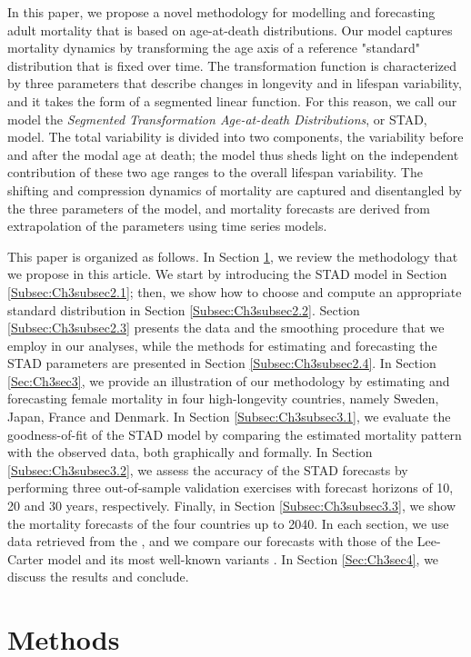 \documentclass[Thesis]{subfiles}
\begin{document}
In this paper, we propose a novel methodology for modelling and forecasting adult mortality that is based on age-at-death distributions. Our model captures mortality dynamics by transforming the age axis of a reference "standard" distribution that is fixed over time. The transformation function is characterized by three parameters that describe changes in longevity and in lifespan variability, and it takes the form of a segmented linear function. For this reason, we call our model the \emph{Segmented Transformation Age-at-death Distributions}, or STAD, model. The total variability is divided into two components, the variability before and after the modal age at death; the model thus sheds light on the independent contribution of these two age ranges to the overall lifespan variability. The shifting and compression dynamics of mortality are captured and disentangled by the three parameters of the model, and mortality forecasts are derived from extrapolation of the parameters using time series models. 

This paper is organized as follows. In Section \ref{Sec:Ch3sec2}, we review the methodology that we propose in this article. We start by introducing the STAD model in Section \ref{Subsec:Ch3subsec2.1}; then, we show how to choose and compute an appropriate standard distribution in Section \ref{Subsec:Ch3subsec2.2}. Section \ref{Subsec:Ch3subsec2.3} presents the data and the smoothing procedure that we employ in our analyses, while the methods for estimating and forecasting the STAD parameters are presented in Section \ref{Subsec:Ch3subsec2.4}. In Section \ref{Sec:Ch3sec3}, we provide an illustration of our methodology by estimating and forecasting female mortality in four high-longevity countries, namely Sweden, Japan, France and Denmark. In Section \ref{Subsec:Ch3subsec3.1}, we evaluate the goodness-of-fit of the STAD model by comparing the estimated mortality pattern with the observed data, both graphically and formally. In Section \ref{Subsec:Ch3subsec3.2}, we assess the accuracy of the STAD forecasts by performing three out-of-sample validation exercises with forecast horizons of 10, 20 and 30 years, respectively. Finally, in Section \ref{Subsec:Ch3subsec3.3}, we show the mortality forecasts of the four countries up to 2040. In each section, we use data retrieved from the \cite{HMD}, and we compare our forecasts with those of the Lee-Carter model and its most well-known variants \citep{shang2011point}. In Section \ref{Sec:Ch3sec4}, we discuss the results and conclude. 


\section{Methods}\label{Sec:Ch3sec2}
\end{document}
